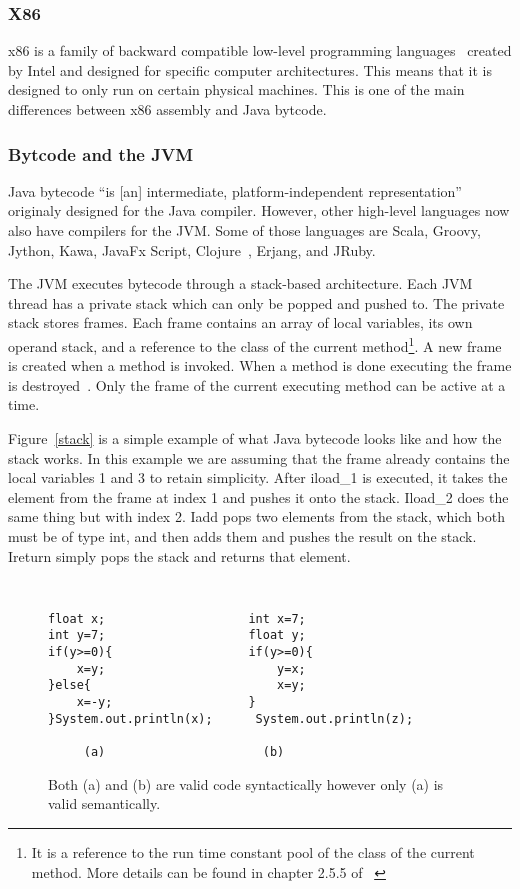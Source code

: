 \documentclass{sig-alternate}
\begin{document}
\subsubsection{X86}
x86 is a family of backward compatible low-level programming languages~\cite{x86assembly:2014} created by Intel and designed for specific computer architectures. This means that it is designed to only run on certain physical machines. This is one of the main differences between x86 assembly and Java bytcode. 

\subsubsection{ Bytcode and the JVM}
Java bytecode ``is [an] intermediate, platform-independent representation''~\cite{FINCH2:2009} originaly designed for the Java compiler. However, other high-level languages now also have compilers for the JVM. Some of those languages are Scala, Groovy, Jython, Kawa, JavaFx Script, Clojure~\cite{FINCH:2011}, Erjang, and JRuby.

The JVM executes bytecode through a stack-based architecture. Each JVM thread has a private stack which can only be popped and pushed to. The private stack stores frames. Each frame contains an array of local variables, its own operand stack, and a reference to the class of the current method\footnote{It is a reference to the run time constant pool of the class of the current method. More details can be found in chapter 2.5.5 of ~\cite{JVMspec:2013}}. A new frame is created when a method is invoked. When a method is done executing the frame is destroyed~\cite{Oracle:2013}. Only the frame of the current executing method can be active at a time.

Figure~\ref{stack} is a simple example of what Java bytecode looks like and how the stack works. In this example we are assuming that the frame already contains the local variables 1 and 3 to retain simplicity. After iload\_1 is executed, it takes the element from the frame at index 1 and pushes it onto the stack. Iload\_2 does the same thing but with index 2. Iadd pops two elements from the stack, which both must be of type int, and then adds them and pushes the result on the stack. Ireturn simply pops the stack and returns that element. 

\begin{figure}
\centering
{\tt
\begin{verbatim}
float x;                    int x=7;
int y=7;                    float y;
if(y>=0){                   if(y>=0){
    x=y;                        y=x;
}else{                          x=y;
    x=-y;                   }
}System.out.println(x);      System.out.println(z);	
     
     (a)                      (b)

\end{verbatim}
}
\caption{Both (a) and (b) are valid code syntactically however only (a) is valid semantically.}
\label{semantics}
\end{figure}
\end{document}
